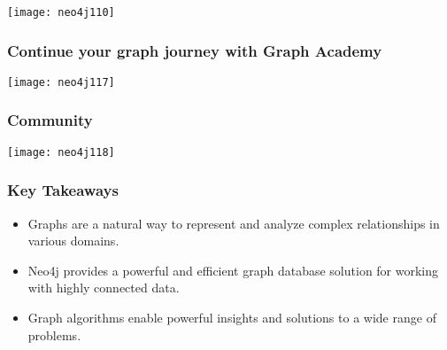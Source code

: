 \begin{frame}[fragile]\frametitle{}

\begin{center}
\texttt{[image: neo4j110]}
\end{center}	  

\end{frame}

\begin{frame}[fragile]\frametitle{Continue your graph journey with Graph Academy}

\begin{center}
\texttt{[image: neo4j117]}
\end{center}	  

\end{frame}

\begin{frame}[fragile]\frametitle{Community}

\begin{center}
\texttt{[image: neo4j118]}
\end{center}	  

\end{frame}


\begin{frame}[fragile]\frametitle{Key Takeaways}
  \begin{itemize}
    \item Graphs are a natural way to represent and analyze complex relationships in various domains.
    \item Neo4j provides a powerful and efficient graph database solution for working with highly connected data.
    \item Graph algorithms enable powerful insights and solutions to a wide range of problems.
  \end{itemize}
\end{frame}

